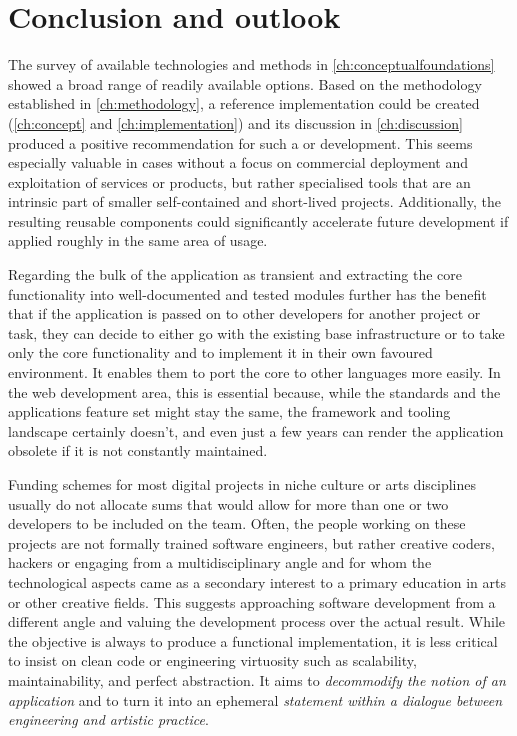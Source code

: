 \chapter{Conclusion and outlook}

The survey of available technologies and methods in \autoref{ch:conceptualfoundations} showed a broad range of readily available options.
Based on the methodology established in \autoref{ch:methodology}, a reference implementation could be created (\autoref{ch:concept} and \autoref{ch:implementation}) and its discussion in \autoref{ch:discussion} produced a positive recommendation for such a  or  development.
This seems especially valuable in cases without a focus on commercial deployment and exploitation of services or products, but rather specialised tools that are an intrinsic part of smaller self-contained and short-lived projects.
Additionally, the resulting reusable components could significantly accelerate future development if applied roughly in the same area of usage.

Regarding the bulk of the application as transient and extracting the core functionality into well-documented and tested modules further has the benefit that if the application is passed on to other developers for another project or task, they can decide to either go with the existing base infrastructure or to take only the core functionality and to implement it in their own favoured environment.
It enables them to port the core to other languages more easily. In the web development area, this is essential because, while the standards and the application\textquotesingle s feature set might stay the same, the framework and tooling landscape certainly doesn't, and even just a few years can render the application obsolete if it is not constantly maintained.

Funding schemes for most digital projects in niche culture or arts disciplines usually do not allocate sums that would allow for more than one or two developers to be included on the team.
Often, the people working on these projects are not formally trained software engineers, but rather creative coders, hackers or engaging from a multidisciplinary angle and for whom the technological aspects came as a secondary interest to a primary education in arts or other creative fields.
This suggests approaching software development from a different angle and valuing the development process over the actual result.
While the objective is always to produce a functional implementation, it is less critical to insist on clean code or engineering virtuosity such as scalability, maintainability, and perfect abstraction.
It aims to \emph{decommodify the notion of an application} and to turn it into an ephemeral \emph{statement within a dialogue between engineering and artistic practice}.

